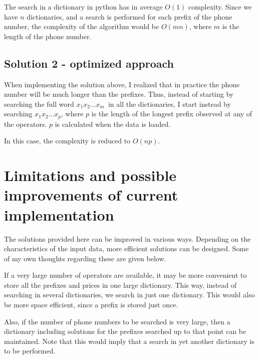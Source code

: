 \documentclass[12pt]{article}
\begin{document}
\vspace{0.2cm}

The search in a dictionary in python has in average $O(1)$
complexity. Since we have $n$ dictionaries, and a search is performed
for each prefix of the phone number, the complexity of the algorithm
would be $O(mn)$, where $m$ is the length of the phone number.

\subsection{Solution 2 - optimized approach}
When implementing the solution above, I realized that in practice the
phone number will be much longer than the prefixes. Thus, instead of
starting by searching the full word $x_1x_2 ... x_m$ in all the
dictionaries, I start instead by searching $x_1x_2 ...x_p$, where $p$
is the length of the longest prefix observed at any of the
operators. $p$ is calculated when the data is loaded.

\vspace{0.2cm}

In this case, the complexity is reduced to $O(np)$. 


\section{Limitations and possible improvements of current implementation}
The solutions provided here can be improved in various ways. Depending
on the characteristics of the input data, more efficient solutions can
be designed. Some of my own thoughts regarding these are given below.

\vspace{0.2cm}

If a very large number of operators are available, it may be more
convenient to store all the prefixes and prices in one large
dictionary. This way, instead of searching in several dictionaries, we
search in just one dictionary. This would also be more space
efficient, since a prefix is stored just once.

\vspace{0.2cm} 

Also, if the number of phone numbers to be searched is very large,
then a dictionary including solutions for the prefixes searched up to
that point can be maintained. Note that this would imply that a search
in yet another dictionary is to be performed.

\vspace{0.2cm}
\end{document}
